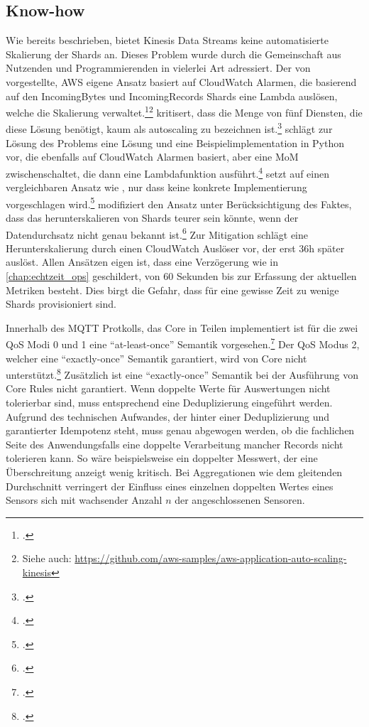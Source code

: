 \subsection{Know-how}
Wie bereits beschrieben, bietet Kinesis Data Streams keine automatisierte Skalierung der Shards an. Dieses Problem wurde durch die Gemeinschaft aus Nutzenden und Programmierenden in vielerlei Art adressiert. Der von \citeauthor{AmazonWebServices.2018} vorgestellte, \ac{AWS} eigene Ansatz basiert auf CloudWatch Alarmen, die basierend auf den IncomingBytes und IncomingRecords Shards eine Lambda auslösen, welche die Skalierung verwaltet.\footcite[Vgl.][]{AmazonWebServices.2018}\nzitat\footnote{Siehe auch: \url{https://github.com/aws-samples/aws-application-auto-scaling-kinesis}} \citeauthor{Pogosova.28.05.2020} kritisert, dass die Menge von fünf Diensten, die diese Lösung benötigt, kaum als autoscaling zu bezeichnen ist.\footcite[Vgl.][]{Pogosova.28.05.2020} \citeauthor{Stanley.2019} schlägt zur Lösung des Problems eine Lösung und eine Beispielimplementation in Python vor, die ebenfalls auf CloudWatch Alarmen basiert, aber eine \ac{MoM} zwischenschaltet, die dann eine Lambdafunktion ausführt.\footcite[Vgl.][]{Stanley.2019} \citeauthor{Prasath.2019} setzt auf einen vergleichbaren Ansatz wie \citeauthor{Stanley.2019}, nur dass keine konkrete Implementierung vorgeschlagen wird.\footcite[Vgl.][]{Prasath.2019} \citeauthor{Cui.2017} modifiziert den Ansatz unter Berücksichtigung des Faktes, dass das herunterskalieren von Shards teurer sein könnte, wenn der Datendurchsatz nicht genau bekannt ist.\footcite[Vgl. auch im Folgendn][]{Cui.2017} Zur Mitigation schlägt \citeauthor{Cui.2017} eine Herunterskalierung durch einen CloudWatch Auslöser vor, der erst 36h später auslöst. Allen Ansätzen eigen ist, dass eine Verzögerung wie in \autoref{chap:echtzeit_ops} geschildert, von 60 Sekunden bis zur Erfassung der aktuellen Metriken besteht. Dies birgt die Gefahr, dass für eine gewisse Zeit zu wenige Shards provisioniert sind.


Innerhalb des MQTT Protkolls, das \AWSIOT{} Core in Teilen implementiert ist für die zwei  \ac{QoS} Modi 0 und 1 eine \enquote{at-least-once} Semantik vorgesehen.\footcite[Vgl. auch im Folgenden][]{OASISOpenConsortium.2014} Der \ac{QoS} Modus 2, welcher eine \enquote{exactly-once} Semantik garantiert, wird von \AWSIOT{} Core nicht unterstützt.\footcite[Vgl.][]{AmazonWebServicesInc..o.J.bd} Zusätzlich ist eine \enquote{exactly-once} Semantik bei der Ausführung von \AWSIOT{} Core Rules nicht garantiert. Wenn doppelte Werte für Auswertungen nicht tolerierbar sind, muss entsprechend eine Deduplizierung eingeführt werden. Aufgrund des technischen Aufwandes, der hinter einer Deduplizierung und garantierter Idempotenz steht, muss genau abgewogen werden, ob die fachlichen Seite des Anwendungsfalls eine doppelte Verarbeitung mancher Records nicht tolerieren kann. So wäre beispielsweise ein doppelter Messwert, der eine Überschreitung anzeigt wenig kritisch. Bei Aggregationen wie dem gleitenden Durchschnitt verringert der Einfluss eines einzelnen doppelten Wertes eines Sensors sich mit wachsender Anzahl $n$ der angeschlossenen Sensoren. 


